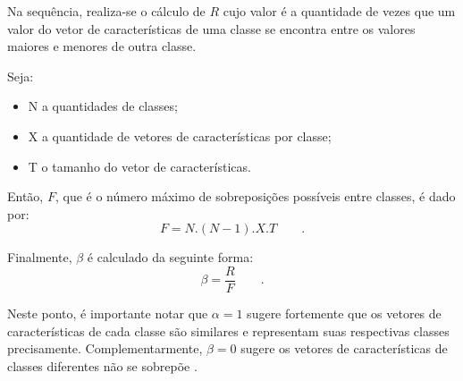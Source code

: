 \documentclass[a4paper,12pt,openright,oneside]{book}
\newenvironment{myenv}[1]
  {\begin{spacing}{#1}}
  {\end{spacing}}
\begin{document}
\begin{myenv}{1.5}
					\par Na sequência, realiza-se o cálculo de $R$ cujo valor é a quantidade de vezes que um valor do vetor de características de uma classe se encontra entre os valores maiores e menores de outra classe.
					
					\par Seja:
					\begin{itemize}
						\item N a quantidades de classes;
						\item X a quantidade de vetores de características por classe;
						\item T o tamanho do vetor de características.
					\end{itemize}
					
					\par Então, $F$, que é o número máximo de sobreposições possíveis entre classes, é dado por:
					\begin{equation}
						F=N.(N-1).X.T \qquad.
					\end{equation}
					\par Finalmente, $\beta$ é calculado da seguinte forma:
					\begin{equation}
						\beta=\dfrac{R}{F} \qquad.
					\end{equation}
					
					\par Neste ponto, é importante notar que $\alpha=1$ sugere fortemente que os vetores de características de cada classe são similares e representam suas respectivas classes precisamente. Complementarmente, $\beta=0$ sugere os vetores de características de classes diferentes não se sobrepõe \cite{8588433}.
					

\end{myenv}
\end{document}
